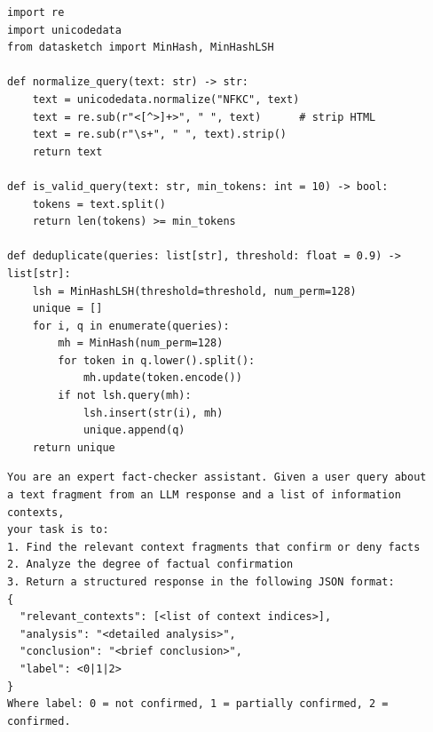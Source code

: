 \documentclass[times]{itmo-student-thesis}
\begin{document}
\begin{lstlisting}[caption={Предобработка запросов из логов},label={lst:preprocessing}]
import re
import unicodedata
from datasketch import MinHash, MinHashLSH

def normalize_query(text: str) -> str:
    text = unicodedata.normalize("NFKC", text)
    text = re.sub(r"<[^>]+>", " ", text)      # strip HTML
    text = re.sub(r"\s+", " ", text).strip()
    return text

def is_valid_query(text: str, min_tokens: int = 10) -> bool:
    tokens = text.split()
    return len(tokens) >= min_tokens

def deduplicate(queries: list[str], threshold: float = 0.9) -> list[str]:
    lsh = MinHashLSH(threshold=threshold, num_perm=128)
    unique = []
    for i, q in enumerate(queries):
        mh = MinHash(num_perm=128)
        for token in q.lower().split():
            mh.update(token.encode())
        if not lsh.query(mh):
            lsh.insert(str(i), mh)
            unique.append(q)
    return unique
\end{lstlisting}

\begin{lstlisting}[language={},caption={Системный промпт для генерации ответов (фрагмент)},label={lst:gen-prompt}]
You are an expert fact-checker assistant. Given a user query about
a text fragment from an LLM response and a list of information contexts,
your task is to:
1. Find the relevant context fragments that confirm or deny facts
2. Analyze the degree of factual confirmation
3. Return a structured response in the following JSON format:
{
  "relevant_contexts": [<list of context indices>],
  "analysis": "<detailed analysis>",
  "conclusion": "<brief conclusion>",
  "label": <0|1|2>
}
Where label: 0 = not confirmed, 1 = partially confirmed, 2 = confirmed.
\end{lstlisting}
\end{document}
